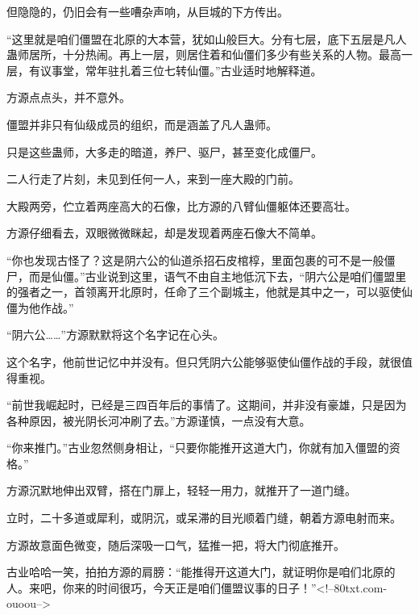 \begin{this_body}
但隐隐的，仍旧会有一些嘈杂声响，从巨城的下方传出。

“这里就是咱们僵盟在北原的大本营，犹如山般巨大。分有七层，底下五层是凡人蛊师居所，十分热闹。再上一层，则居住着和仙僵们多少有些关系的人物。最高一层，有议事堂，常年驻扎着三位七转仙僵。”古业适时地解释道。

方源点点头，并不意外。

僵盟并非只有仙级成员的组织，而是涵盖了凡人蛊师。

只是这些蛊师，大多走的暗道，养尸、驱尸，甚至变化成僵尸。

二人行走了片刻，未见到任何一人，来到一座大殿的门前。

大殿两旁，伫立着两座高大的石像，比方源的八臂仙僵躯体还要高壮。

方源仔细看去，双眼微微眯起，却是发现着两座石像大不简单。

“你也发现古怪了？这是阴六公的仙道杀招石皮棺椁，里面包裹的可不是一般僵尸，而是仙僵。”古业说到这里，语气不由自主地低沉下去，“阴六公是咱们僵盟里的强者之一，首领离开北原时，任命了三个副城主，他就是其中之一，可以驱使仙僵为他作战。”

“阴六公……”方源默默将这个名字记在心头。

这个名字，他前世记忆中并没有。但只凭阴六公能够驱使仙僵作战的手段，就很值得重视。

“前世我崛起时，已经是三四百年后的事情了。这期间，并非没有豪雄，只是因为各种原因，被光阴长河冲刷了去。”方源谨慎，一点没有大意。

“你来推门。”古业忽然侧身相让，“只要你能推开这道大门，你就有加入僵盟的资格。”

方源沉默地伸出双臂，搭在门扉上，轻轻一用力，就推开了一道门缝。

立时，二十多道或犀利，或阴沉，或呆滞的目光顺着门缝，朝着方源电射而来。

方源故意面色微变，随后深吸一口气，猛推一把，将大门彻底推开。

古业哈哈一笑，拍拍方源的肩膀：“能推得开这道大门，就证明你是咱们北原的人。来吧，你来的时间很巧，今天正是咱们僵盟议事的日子！”<!--80txt.com-ouoou-->

\end{this_body}

